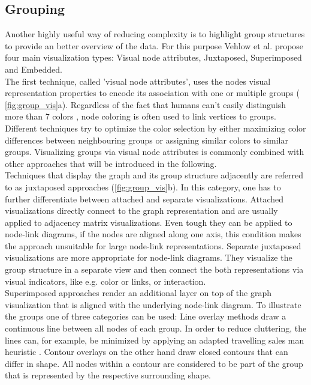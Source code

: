 \subsection{Grouping}
Another highly useful way of reducing complexity is to highlight group structures to provide an better overview of the data. For this purpose Vehlow et al.\cite{Vehlow2015} propose four main visualization types: Visual node attributes, Juxtaposed, Superimposed and Embedded.\\
The first technique, called 'visual node attributes', uses the nodes visual representation properties to encode its association with one or multiple groups ( \autoref{fig:group_vis}a). Regardless of the fact that humans can't easily distinguish more than 7 colors \cite{Healey1996}, node coloring is often used to link vertices to groups. Different techniques try to optimize the color selection by either maximizing color differences between neighbouring groups or assigning similar colors to similar groups. Visualizing groups via visual node attributes is commonly combined with other approaches that will be introduced in the following.\\
Techniques that display the graph and its group structure adjacently are referred to as juxtaposed approaches (\autoref{fig:group_vis}b). In this category, one has to further differentiate between attached and separate visualizations. Attached visualizations directly connect to the graph representation and are usually applied to adjacency matrix visualizations. Even tough they can be applied to node-link diagrams, if the nodes are aligned along one axis, this condition makes the approach unsuitable for large node-link representations.
Separate juxtaposed visualizations are more appropriate for node-link diagrams. They visualize the group structure in a separate view and then connect the both representations via visual indicators, like e.g. color or links, or interaction.\\
Superimposed approaches render an additional layer on top of the graph visualization that is aligned with the underlying node-link diagram. To illustrate the groups one of three categories can be used: Line overlay methods draw a continuous line between all nodes of each group. In order to reduce cluttering, the lines can, for example, be minimized by applying an adapted travelling sales man heuristic \cite{Alper2011}. Contour overlays on the other hand draw closed contours that can differ in shape. All nodes within a contour are considered to be part of the group that is represented by the respective surrounding shape.
